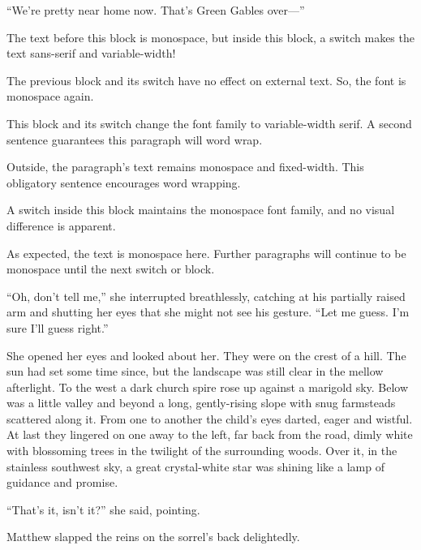 \documentclass[a4paper]{article}
\begin{document}
``We're pretty near home now. That's Green Gables over---''

{\sffamily The text before this block is monospace, but inside this block, a switch makes the text sans-serif and variable-width!}

The previous block and its switch have no effect on external text. So, the font is monospace again.

{\rmfamily This block and its switch change the font family to variable-width serif. A second sentence guarantees this paragraph will word wrap.}

Outside, the paragraph's text remains monospace and fixed-width. This obligatory sentence encourages word wrapping.

{\ttfamily A switch inside this block maintains the monospace font family, and no visual difference is apparent.}

As expected, the text is monospace here. Further paragraphs will continue to be monospace until the next switch or block.

{\sffamily ``Oh, don't tell me,'' she interrupted breathlessly, catching at his partially raised arm and shutting her eyes that she might not see his gesture. ``Let me guess. I'm sure I'll guess right.''

She opened her eyes and looked about her. They were on the crest of a hill. The sun had set some time since, but the landscape was still clear in the mellow afterlight. To the west a dark church spire rose up against a marigold sky. Below was a little valley and beyond a long, gently-rising slope with snug farmsteads scattered along it. From one to another the child's eyes darted, eager and wistful. At last they lingered on one away to the left, far back from the road, dimly white with blossoming trees in the twilight of the surrounding woods. Over it, in the stainless southwest sky, a great crystal-white star was shining like a lamp of guidance and promise.}

``That's it, isn't it?'' she said, pointing.

Matthew slapped the reins on the sorrel's back delightedly.
\end{document}
